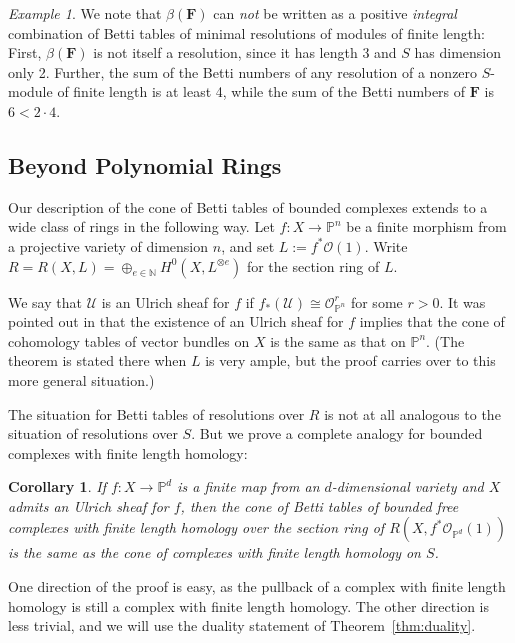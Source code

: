 \documentclass[12pt]{amsart}
\newtheorem{cor}[lemma]{Corollary}
\theoremstyle{definition}
\theoremstyle{remark}
\newtheorem{example}[lemma]{Example}
\newcommand{\PP}{\mathbb{P}}
\newcommand{\cO}{\mathcal{O}}
\newcommand{\cU}{\mathcal{U}}
\newcommand{\FF}{\mathbf{F}}
\newcommand{\defi}[1]{\textsf{#1}} %
\renewcommand{\P}{{\mathbb P}}
\begin{document}
\begin{example}
We note that $\beta(\FF)$ can \emph{not} be written as a positive \emph{integral} combination of Betti tables of minimal resolutions of modules of finite length: First, $\beta(\FF)$ is not itself a resolution, since it has length 3 and $S$ has dimension only 2. 
Further,  the sum of the Betti numbers of any resolution of a nonzero $S$-module of finite length is at least 4, while the sum of the Betti numbers of $\FF$ is $6<2\cdot 4$.
\end{example}



\subsection*{Beyond Polynomial Rings}
Our description of the cone of Betti tables of bounded complexes
extends to a wide class of rings in the following way. Let $f\colon X\to \PP^{n}$ be a finite
morphism from a projective variety of dimension $n$, and set $L:=f^*\cO(1)$. 
Write $R=R(X,L)=\oplus_{e\in \mathbb N} H^0(X,L^{\otimes e})$ for the \defi{section ring}
of $L$.

We say that $\cU$ is an \defi{Ulrich sheaf} for $f$ if $f_*(\cU)\cong \cO_{\PP^n}^r$ for some $r>0$.  It was pointed out in \cite[Theorem~5]{eis-schrey-abel} that the existence of an Ulrich sheaf for $f$ implies that  the cone of cohomology tables of vector bundles on $X$ is the same as that on $\PP^{n}$. (The theorem is stated there when $L$ is very ample, but the proof
carries over to this more general situation.) 

The situation for Betti tables of resolutions over $R$ is not at all analogous to the situation of resolutions over $S$. But we prove a complete analogy for bounded complexes with finite length homology:

\begin{cor}\label{cor:isom cones}
If $f\colon X\to \P^{d}$ is a  finite map from an $d$-dimensional variety and $X$ admits an Ulrich sheaf for $f$, then the cone of Betti tables
of bounded free complexes with finite length homology over  the section ring
of $R(X,f^*\cO_{\PP^d}(1))$ is the same
as the cone of complexes with finite length homology on $S$. 
\end{cor}

One direction of the proof is easy, as the pullback of a complex with finite length homology is still a complex with finite length homology.  The other direction is less trivial, and we will use the duality statement of Theorem~\ref{thm:duality}.
\end{document}
